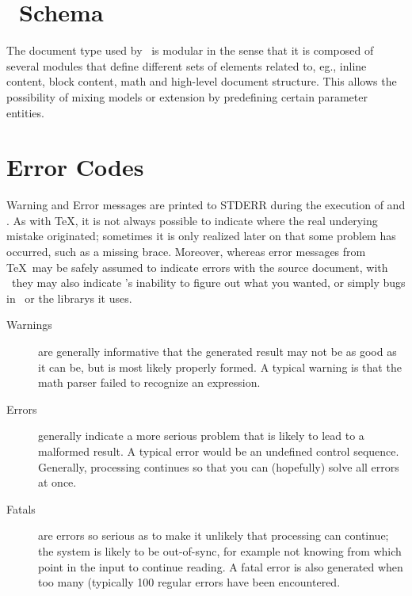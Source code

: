 \documentclass{book}
\begin{document}
\chapter[Schema]{\LaTeXML\ Schema}\label{schema}
The document type used by \LaTeXML\ is modular in the sense
that it is composed of several modules that define different
sets of elements related to, eg., inline content, block content,
math and high-level document structure.  This allows the possibility
of mixing models or extension by predefining certain parameter entities.



\chapter{Error Codes}\label{errorcodes}
Warning and Error messages are printed to STDERR during the execution
of  and .  As with \TeX, it is
not always possible to indicate where the real underying mistake
originated; sometimes it is only realized later on that some problem
has occurred, such as a missing brace. Moreover, whereas error messages
from \TeX\ may be safely assumed to indicate errors with the source
document, with \LaTeXML\ they may also indicate \LaTeXML's inability
to figure out what you wanted, or simply bugs in \LaTeXML\ or the librarys it uses.

\begin{description}
\item[Warnings] are generally
informative that the generated result may not be as good as it can be,
but is most likely properly formed.  A typical warning is that
the math parser failed to recognize an expression.
\item[Errors] generally indicate a more serious problem that is likely
to lead to a malformed result.  A typical error would be an undefined
control sequence.  Generally, processing continues so that you can
(hopefully) solve all errors at once.
\item[Fatals] are errors so serious as to make it unlikely that processing
can continue; the system is likely to be out-of-sync, for example
not knowing from which  point in the input to continue reading.
A fatal error is also generated when too many (typically 100 regular errors
have been encountered.
\end{description}
\end{document}
